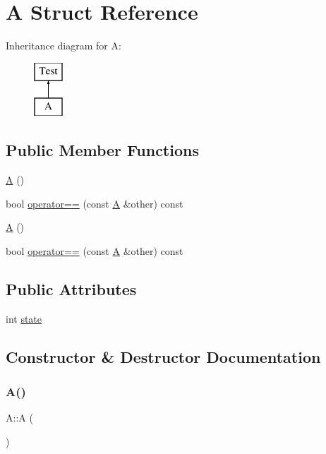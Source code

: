 \hypertarget{structA}{}\section{A Struct Reference}
\label{structA}
Inheritance diagram for A\+:\begin{figure}[H]
\begin{center}
\leavevmode
\includegraphics[height=2.000000cm]{structA}
\end{center}
\end{figure}
\subsection*{Public Member Functions}
\begin{DoxyCompactItemize}
\item 
\mbox{\hyperlink{structA_a4142862ec27f2f3d8deb026d51a5c5a0}{A}} ()
\item 
bool \mbox{\hyperlink{structA_a7d3af89dc96fc459438e3d5c6c57c388}{operator==}} (const \mbox{\hyperlink{structA}{A}} \&other) const
\item 
\mbox{\hyperlink{structA_a4142862ec27f2f3d8deb026d51a5c5a0}{A}} ()
\item 
bool \mbox{\hyperlink{structA_a7d3af89dc96fc459438e3d5c6c57c388}{operator==}} (const \mbox{\hyperlink{structA}{A}} \&other) const
\end{DoxyCompactItemize}
\subsection*{Public Attributes}
\begin{DoxyCompactItemize}
\item 
int \mbox{\hyperlink{structA_a529f460ee223b18520cb7fa3740d6ebd}{state}}
\end{DoxyCompactItemize}


\subsection{Constructor \& Destructor Documentation}
\mbox{\label{structA_a4142862ec27f2f3d8deb026d51a5c5a0}} 
\subsubsection{\texorpdfstring{A()}{A()}\hspace{0.1cm}{\footnotesize\ttfamily [1/2]}}
{\footnotesize\ttfamily A\+::A (\begin{DoxyParamCaption}{ }\end{DoxyParamCaption})\hspace{0.3cm}{\ttfamily [inline]}}

